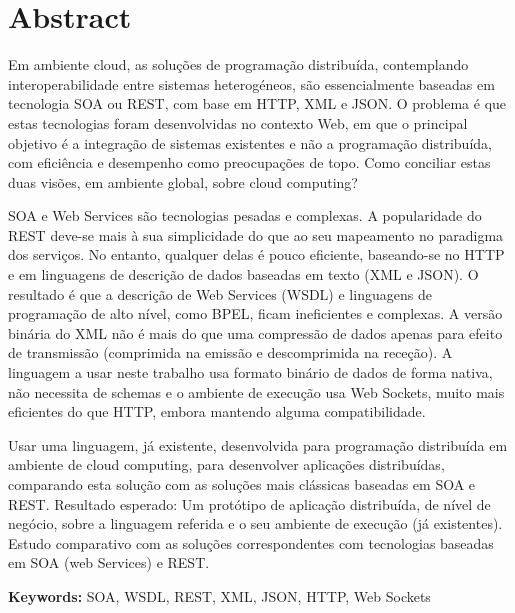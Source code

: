 
\section*{Abstract}


Em ambiente cloud, as soluções de programação distribuída, contemplando interoperabilidade entre sistemas heterogéneos,
são essencialmente baseadas em tecnologia SOA ou REST, com base em HTTP, XML e JSON. O problema é que estas tecnologias
foram desenvolvidas no contexto Web, em que o principal objetivo é a integração de sistemas existentes e não a programação
distribuída, com eficiência e desempenho como preocupações de topo. Como conciliar estas duas visões, em ambiente global,
sobre cloud computing?



SOA e Web Services são tecnologias pesadas e complexas. A popularidade do REST deve-se mais à sua simplicidade do que ao seu
mapeamento no paradigma dos serviços. No entanto, qualquer delas é pouco eficiente, baseando-se no HTTP e em linguagens de
descrição de dados baseadas em texto (XML e JSON). O resultado é que a descrição de Web Services (WSDL) e linguagens de
programação de alto nível, como BPEL, ficam ineficientes e complexas. A versão binária do XML não é mais do que uma compressão
de dados apenas para efeito de transmissão (comprimida na emissão e descomprimida na receção). A linguagem a usar neste
trabalho usa formato binário de dados de forma nativa, não necessita de schemas e o ambiente de execução usa Web Sockets,
muito mais eficientes do que HTTP, embora mantendo alguma compatibilidade.

Usar uma linguagem, já existente, desenvolvida para programação distribuída em ambiente de cloud computing, para desenvolver
aplicações distribuídas, comparando esta solução com as soluções mais clássicas baseadas em SOA e REST.
Resultado esperado: Um protótipo de aplicação distribuída, de nível de negócio, sobre a linguagem referida e o seu ambiente
de execução (já existentes). Estudo comparativo com as soluções correspondentes com tecnologias baseadas em SOA (web Services)
e REST.

\vfill

\textbf{\Large Keywords:} SOA, WSDL, REST, XML, JSON, HTTP, Web Sockets
